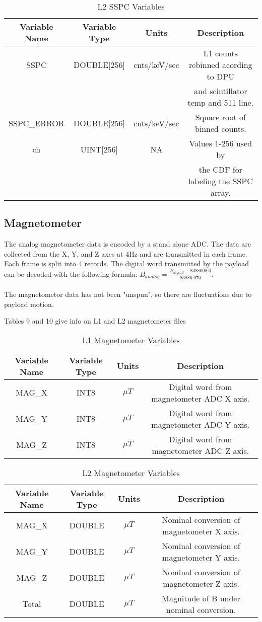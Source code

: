 \documentclass{article}
\begin{document}
\begin{table}[H]
\caption{L2 SSPC Variables}
\begin{tabular}{|c|c|c|c|}
\hline
Variable Name&Variable Type&Units&Description\\ \hline
SSPC&DOUBLE[256]&cnts/keV/sec&L1 counts rebinned acording to DPU\\
~&~&~&and scintillator temp and 511 line.\\ 
SSPC\_ERROR&DOUBLE[256]&cnts/keV/sec&Square root of binned counts.\\ 
ch&UINT[256]&NA&Values 1-256 used by\\
~&~&~&the CDF for labeling the SSPC array.\\
\hline
\end{tabular}
\end{table}

\subsection{Magnetometer}
The analog magnetometer data is encoded by a stand alone ADC. The data are collected from the X, Y, and Z axes at 4Hz and are transmitted in each frame. Each frame is split into 4 records. The digital word transmitted by the payload can be decoded with the following formula: $B_{analog} = \frac{B_{digital} - 8388608.0}{83886.070}$.\\\\

The magnetometor data has not been "unspun", so there are fluctuations due to payload motion.

Tables 9 and 10 give info on L1 and L2 magnetometer files

\begin{table}[H]
\caption{L1 Magnetometer Variables}
\begin{tabular}{|c|c|c|c|}
\hline
Variable Name&Variable Type&Units&Description\\ \hline
MAG\_X&INT8&$\mu{}T$&Digital word from magnetometer ADC X axis.\\ 
MAG\_Y&INT8&$\mu{}T$&Digital word from magnetometer ADC Y axis.\\ 
MAG\_Z&INT8&$\mu{}T$&Digital word from magnetometer ADC Z axis.\\ 
\hline
\end{tabular}
\end{table}

\begin{table}[H]
\caption{L2 Magnetometer Variables}
\begin{tabular}{|c|c|c|c|}
\hline
Variable Name&Variable Type&Units&Description\\ \hline
MAG\_X&DOUBLE&$\mu{}T$&Nominal conversion of magnetometer X axis.\\
MAG\_Y&DOUBLE&$\mu{}T$&Nominal conversion of magnetometer Y axis.\\
MAG\_Z&DOUBLE&$\mu{}T$&Nominal conversion of magnetometer Z axis.\\
Total&DOUBLE&$\mu{}T$&Magnitude of B under nominal conversion.\\
\hline
\end{tabular}
\end{table}
\end{document}
